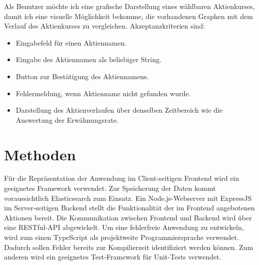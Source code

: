 \documentclass[a4paper, 10pt, conference]{IEEEtran}
\begin{document}
Als Benutzer möchte ich eine grafische Darstellung eines wählbaren Aktienkurses, damit ich eine visuelle Möglichkeit bekomme, die vorhandenen Graphen mit dem Verlauf des Aktienkurses zu vergleichen. Akzeptanzkriterien sind:
\begin{itemize}
\item Eingabefeld für einen Aktiennamen.
\item Eingabe des Aktiennamen als beliebiger String.
\item Button zur Bestätigung des Aktiennamens.
\item Fehlermeldung, wenn Aktienname nicht gefunden wurde.
\item Darstellung des Aktienverlaufen über denselben Zeitbereich wie die Auswertung der Erwähnungsrate.
\end{itemize}

\newpage
\section{Methoden} \label{s:methoden}

Für die Repräsentation der Anwendung im Client-seitigen Frontend wird ein geeignetes Framework verwendet. Zur Speicherung der Daten kommt voraussichtlich Elasticsearch zum Einsatz. Ein Node.js-Webserver mit ExpressJS im Server-seitigen Backend stellt die Funktionalität der im Frontend angebotenen Aktionen bereit. Die Kommunikation zwischen Frontend und Backend wird über eine RESTful-API abgewickelt. Um eine fehlerfreie Anwendung zu entwickeln, wird zum einen TypeScript als projektweite Programmiersprache verwendet. Dadurch sollen Fehler bereits zur Kompilierzeit identifiziert werden können. Zum anderen wird ein geeignetes Test-Framework für Unit-Tests verwendet.

\printbibliography
\end{document}
